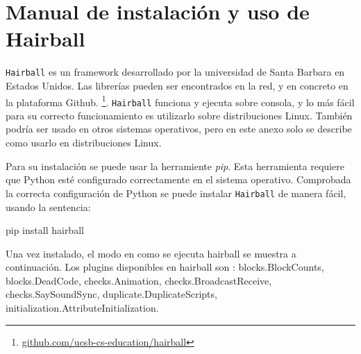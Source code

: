 \documentclass[a4paper, 12pt]{book}
\begin{document}

\cleardoublepage
\appendix

\chapter{Manual de instalación y uso de Hairball}
\texttt{Hairball} es un framework desarrollado por la universidad de Santa
Barbara en Estados Unidos. Las librerías pueden ser encontrados en la red,
y en concreto en la plataforma Github. \footnote{\url{github.com/ucsb-cs-education/hairball}}.
\texttt{Hairball} funciona y ejecuta sobre consola, y lo más fácil para su
correcto funcionamiento es utilizarlo sobre distribuciones Linux. También 
podría ser usado en otros sistemas operativos, pero en este anexo solo se
describe como usarlo en distribuciones Linux. 

Para su instalación se puede usar la herramiente \emph{pip}. Esta herramienta
requiere que Python esté configurado correctamente en el sistema operativo.
Comprobada la correcta configuración de Python se puede instalar \texttt{Hairball}
de manera fácil, usando la sentencia:

\begin{center}
pip install hairball
\end{center}


Una vez instalado, el modo en como se ejecuta hairball se muestra a continuación. 
Los plugins disponibles en hairball son : blocks.BlockCounts, blocks.DeadCode, 
checks.Animation, checks.BroadcastReceive, checks.SaySoundSync,
duplicate.DuplicateScripts, initialization.AttributeInitialization.





\cleardoublepage


\end{document}
